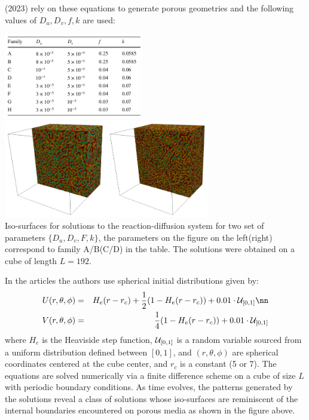 \textcite{gama23} (2023) rely on these equations to generate porous geometries 
and the following values of $D_u,D_v,f,k$ are used:

\begin{center}
\includegraphics[width=6cm]{python_codes/fieldstone_171/images/gama01}
\includegraphics[width=9cm]{python_codes/fieldstone_171/images/gama02}\\
{\captionfont Iso-surfaces for solutions to the reaction-diffusion system 
for two set of parameters $\{D_u,D_v,F,k\}$, the parameters on the figure on 
the left(right) correspond to family A/B(C/D) in the table. The solutions were
obtained on a cube of length $L=192$.}
\end{center}

In the articles the authors use spherical initial distributions given by:
\begin{eqnarray}
U(r,\theta,\phi) &=& H_e(r-r_c) +\frac12 (1-H_e(r-r_c)) + 0.01 \cdot {\cal U}_{[0,1]} \nn\\
V(r,\theta,\phi) &=& \frac14 (1-H_e(r-r_c)) + 0.01 \cdot {\cal U}_{[0,1]}
\end{eqnarray}
where $H_e$ is the Heaviside step function, ${\cal U}_{[0,1]}$ is a random variable sourced from a 
uniform distribution defined between $[0,1]$, and $(r,\theta,\phi)$ are spherical coordinates centered at
the cube center, and $r_c$ is a constant (5 or 7).
The equations are solved numerically via a finite difference scheme on a cube of size $L$
with periodic boundary conditions. As time evolves, the patterns generated by
the solutions reveal a class of solutions whose iso-surfaces are reminiscent of the internal
boundaries encountered on porous media as shown in the figure above.



